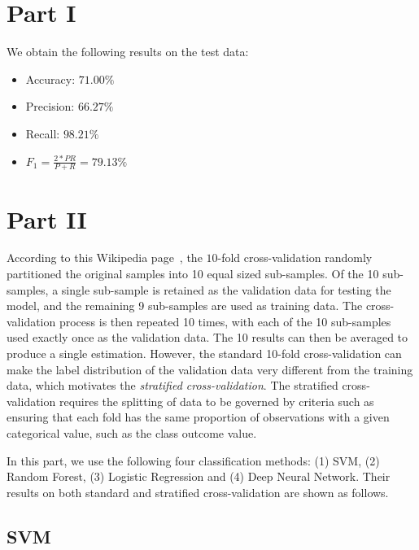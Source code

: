 \documentclass{article}
\begin{document}
\noindent{}
\vspace{-0.4 cm}
\section*{Part I}

We obtain the following results on the test data:
\begin{itemize}
	\item Accuracy: $71.00\%$
	\item Precision: $66.27\%$
	\item Recall: $98.21\%$
	\item $F_1 = \frac{2 * PR}{P + R} = 79.13\%$
\end{itemize}

\section*{Part II}

According to this Wikipedia page~\cite{wikipedia_2022}, the $10$-fold cross-validation randomly partitioned the original samples into 10 equal sized sub-samples. Of the 10 sub-samples, a single sub-sample is retained as the validation data for testing the model, and the remaining 9 sub-samples are used as training data. The cross-validation process is then repeated 10 times, with each of the 10 sub-samples used exactly once as the validation data. The 10 results can then be averaged to produce a single estimation. However, the standard 10-fold cross-validation can make the label distribution of the validation data very different from the training data, which motivates the {\em stratified cross-validation}. The stratified cross-validation requires the splitting of data to be governed by criteria such as ensuring that each fold has the same proportion of observations with a given categorical value, such as the class outcome value. 

In this part, we use the following four classification methods: (1) SVM, (2) Random Forest, (3) Logistic Regression and (4) Deep Neural Network. Their results on both standard and stratified cross-validation are shown as follows. 

\subsection*{SVM}
\end{document}
